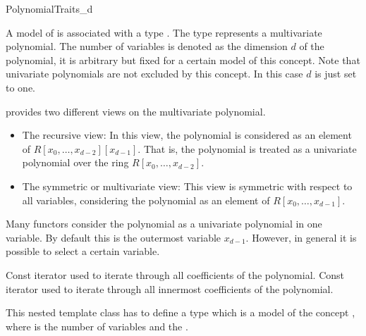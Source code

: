 \begin{ccRefConcept}{PolynomialTraits_d}

\ccDefinition
A model of  is associated with a type 
. 
The type  represents a multivariate polynomial.
The number of variables is denoted as the dimension $d$ of the polynomial,
it is arbitrary but fixed for a certain model of this concept.  
Note that univariate polynomials are not excluded by this concept. In this case 
$d$ is just set to one.  

 provides two different views on the 
multivariate polynomial. 

\begin{itemize}
\item The recursive view:  In this view, the polynomial is considered as 
an element of $R[x_0,\dots,x_{d-2}][x_{d-1}]$. That is, the polynomial 
is treated as a univariate polynomial over the ring $R[x_0,\dots,x_{d-2}]$. 
\item The symmetric or multivariate view: This view is symmetric 
with respect to all variables,
considering the polynomial as an element of $R [x_0,\dots,x_{d-1}]$.
\end{itemize}

Many functors consider the polynomial as a univariate polynomial in one variable.
By default this is the outermost variable $x_{d-1}$. However, in general it 
is possible to select a certain variable. 

\ccRefines


\ccConstants
 

\ccTypes

\ccGlue
{}\ccGlue
{}

{ Const iterator used to iterate through all coefficients of the polynomial.}
{ Const iterator used to iterate through all innermost coefficients of the polynomial.}

{This nested template class has to define a type  which is a model 
of the concept , where  is the number of 
variables and  the .}


\end{ccRefConcept}
